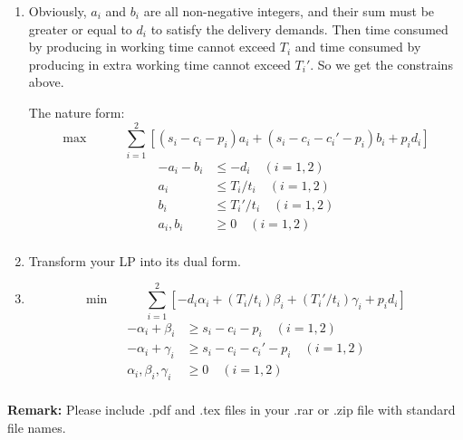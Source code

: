 \documentclass[12pt,a4paper]{article}
\makeatletter
\newtheorem*{solution}{Solution}
\theoremstyle{definition}
\renewenvironment{solution}[1][Solution] {\par\pushQED{\qed}\normalfont\topsep6\p@\@plus6\p@\relax\trivlist\item[\hskip\labelsep\bfseries#1\@addpunct{.}]\ignorespaces}{\popQED\endtrivlist\@endpefalse} \makeatother
\makeatother
\begin{document}
\begin{enumerate}
\begin{enumerate}
\begin{solution}
	Obviously, $a_i$ and $b_i$ are all non-negative integers, and their sum must be greater or equal to $d_i$ to satisfy the delivery demands. Then time consumed by producing in working time cannot exceed $T_i$ and time consumed by producing in extra working time cannot exceed $T_i'$. So we get the constrains above.
	
	The nature form:
	$$
	\text{max}\quad\quad\quad\sum_{i=1}^{2}\left[(s_i-c_i-p_i)a_i+(s_i-c_i-c_i'-p_i)b_i+p_id_i\right]
	$$
	\begin{equation}
	\begin{aligned}
	-a_i-b_i&\leq -d_i\quad(i=1,2)\\
	a_i     &\leq T_i/t_i\quad(i=1,2)\\
	b_i     &\leq T_i'/t_i\quad(i=1,2)\\
	a_i,b_i &\geq 0\quad(i=1,2)\\
	\end{aligned}\nonumber
	\end{equation}
	
\end{solution}
\item Transform your LP into its dual form.

\begin{solution}
	$$
	\text{min}\quad\quad\quad\sum_{i=1}^{2}\left[-d_i\alpha_i + (T_i/t_i)\beta_i + (T_i'/t_i)\gamma_i + p_id_i\right]
	$$
	\begin{equation}
	\begin{aligned}
	-\alpha_i+\beta_i &\geq s_i-c_i-p_i\quad(i=1,2)\\
	-\alpha_i+\gamma_i&\geq s_i-c_i-c_i'-p_i\quad(i=1,2)\\
	\alpha_i, \beta_i,\gamma_i & \geq 0\quad(i=1,2)\\
	\end{aligned}\nonumber
	\end{equation}
\end{solution}
\end{enumerate}

\end{enumerate}

\textbf{Remark:} Please include .pdf and  .tex files in your .rar or .zip file with standard file names.

\end{document}
